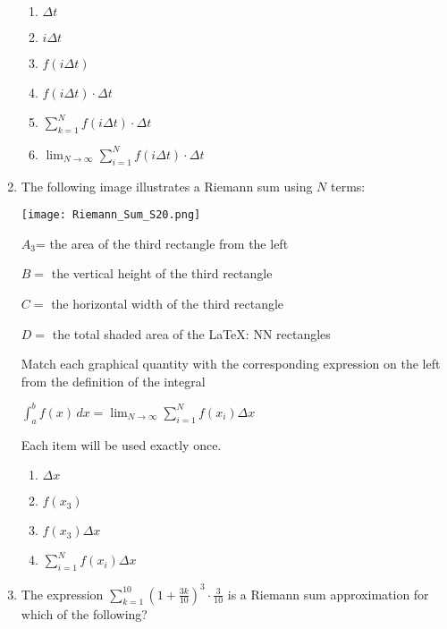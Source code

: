 \documentclass[12pt]{report}
\begin{document}
\begin{enumerate}
\begin{enumerate}
\item $\Delta t$

\item $i\Delta t$

\item $f(i\Delta t)$

\item $f(i\Delta t)\cdot \Delta t$

\item $\sum_{k=1}^Nf(i\Delta t)\cdot \Delta t$

\item $\lim_{N\rightarrow\infty}\sum_{i=1}^Nf(i\Delta t)\cdot \Delta t$

\end{enumerate}

\pagebreak

\item The following image illustrates a Riemann sum using $N$ terms:

\begin{center}
	\texttt{[image: Riemann\_Sum\_S20.png]}
\end{center}

$A_{3}$= the area of the third rectangle from the left

$B =$ the vertical height of the third rectangle

$C =$ the horizontal width of the third rectangle

$D =$ the total shaded area of the LaTeX: NN rectangles

Match each graphical quantity with the corresponding expression on the left from the definition of the integral

$\int_a^bf(x)\,dx=\lim_{N\to\infty}\sum_{i=1}^Nf(x_i)\Delta x$

Each item will be used exactly once.

\begin{enumerate}

\item $\Delta x$

\item $f(x_3)$

\item $f(x_3)\Delta x$

\item $\sum_{i=1}^Nf(x_i)\Delta x$

\end{enumerate}

\item The expression $\sum_{k=1}^{10}\left(1+\frac{3k}{10}\right)^3\cdot\frac{3}{10}$  is a Riemann sum approximation for which of the following?


\end{enumerate}
\end{document}
